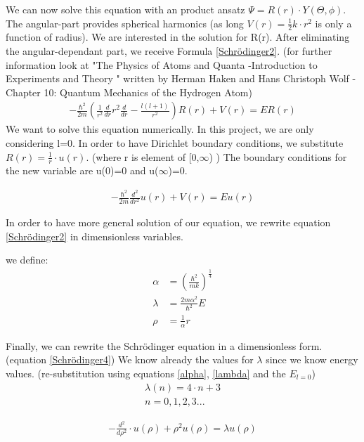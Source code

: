 \documentclass[10pt,a4paper]{article}
\begin{document}
We can now solve this equation with an product ansatz $\Psi= R(r) \cdot Y(\Theta, \phi )$. The angular-part provides spherical harmonics (as long $V(r)=\frac{1}{2}k \cdot r^2$ is only a function of radius). We are interested in the solution for R(r). After eliminating the angular-dependant part, we receive Formula \ref{Schrödinger2}. (for further information look at "The Physics of Atoms and Quanta -Introduction to Experiments and Theory " written by Herman Haken and Hans Christoph Wolf - Chapter 10: Quantum Mechanics of the Hydrogen Atom)
\begin{align}
-\frac{\hbar^2}{2 m} \left( \frac{1}{r^2} \frac{d}{dr}r^2 \frac{d}{dr}-\frac{l(l+1)}{r^2} \right) R(r)+ V(r) = E R(r) \label{Schrödinger2}
\end{align}
We want to solve this equation numerically. In this project, we are only considering l=0.
In order to have Dirichlet boundary conditions, we substitute $R(r)=\frac{1}{r}\cdot u(r)$. (where r is element of [0,$\infty$)  ) The boundary conditions for the new variable are u(0)=0 and u($\infty$)=0. 

\begin{align}
-\frac{\hbar^2}{2 m}  \frac{d^2}{dr^2} u(r)+ V(r) = E u(r) \label{Schrödinger3}
\end{align}

In order to have more general solution of our equation, we rewrite equation \ref{Schrödinger2} in dimensionless variables. 

we define:
\begin{align}
\alpha&= \left(\frac{\hbar^2}{mk}\right)^{\frac{1}{4}} \\ \label{alpha}
\lambda&=\frac{2m\alpha^2}{\hbar^2}E \\ \label{lambda}
\rho&= \frac{1}{\alpha} r
\end{align}

Finally, we can rewrite the Schrödinger equation in a dimensionless form. (equation \ref{Schrödinger4}) We know already the values for $\lambda$ since we know energy values. (re-substitution using equations \ref{alpha}, \ref{lambda} and the $E_{l=0}$)
\begin{align}
\lambda(n)= 4 \cdot n +3 \\
n=0,1,2,3...
\end{align}

\begin{align}
-\frac{d^2}{d \rho^2} \cdot u(\rho) + \rho^2 u( \rho ) = \lambda u(\rho) \label{Schrödinger4}
\end{align}
\end{document}
